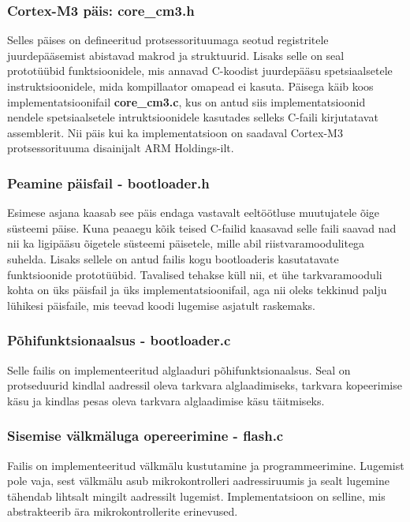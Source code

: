 \documentclass[12pt,a4paper]{article}
\begin{document}
\subsubsection{Cortex-M3 päis: \textbf{core\_cm3.h}}
Selles päises on defineeritud protsessorituumaga seotud registritele
juurdepääsemist abistavad makrod ja struktuurid. Lisaks selle on seal
prototüübid funktsioonidele, mis annavad C-koodist juurdepääsu spetsiaalsetele
instruktsioonidele, mida kompillaator omapead ei kasuta. Päisega käib koos
implementatsioonifail \textbf{core\_cm3.c}, kus on antud siis implementatsioonid
nendele spetsiaalsetele intruktsioonidele kasutades selleks C-faili kirjutatavat
assemblerit. Nii päis kui ka implementatsioon on saadaval Cortex-M3
protsessorituuma disainijalt ARM Holdings-ilt.

\subsubsection{Peamine päisfail - \textbf{bootloader.h}}
Esimese asjana kaasab see päis endaga vastavalt eeltöötluse muutujatele õige
süsteemi päise. Kuna peaaegu kõik teised C-failid kaasavad selle faili saavad
nad nii ka ligipääsu õigetele süsteemi päisetele, mille abil
riistvaramoodulitega suhelda. Lisaks sellele on antud failis kogu bootloaderis
kasutatavate funktsioonide prototüübid. Tavalised tehakse küll nii, et ühe
tarkvaramooduli kohta on üks päisfail ja üks implementatsioonifail, aga nii
oleks tekkinud palju lühikesi päisfaile, mis teevad koodi lugemise asjatult
raskemaks.

\subsubsection{Põhifunktsionaalsus - \textbf{bootloader.c}}
Selle failis on implementeeritud alglaaduri põhifunktsionaalsus. Seal on
protseduurid kindlal aadressil oleva tarkvara alglaadimiseks, tarkvara
kopeerimise käsu ja kindlas pesas oleva tarkvara alglaadimise käsu täitmiseks.

\subsubsection{Sisemise välkmäluga opereerimine - \textbf{flash.c}}
Failis on implementeeritud välkmälu kustutamine ja programmeerimine.
Lugemist pole vaja, sest välkmälu asub mikrokontrolleri aadressiruumis ja sealt
lugemine tähendab lihtsalt mingilt aadressilt lugemist. Implementatsioon on
selline, mis abstrakteerib ära mikrokontrollerite erinevused.
\end{document}
